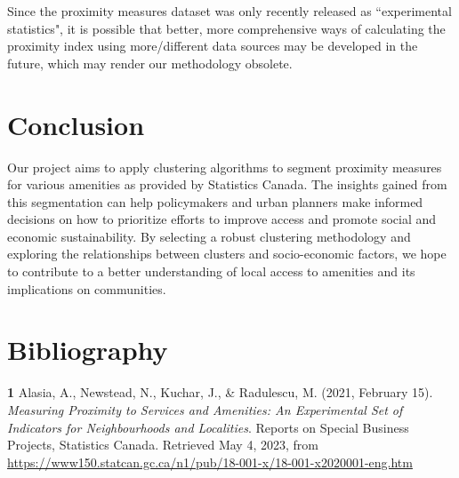 \documentclass[11pt, a4paper]{article}
\newcommand{\comment}[1]{}
\begin{document}
Since the proximity measures dataset was only recently released as ``experimental statistics", it is possible that better, more comprehensive ways of calculating the proximity index using more/different data sources may be developed in the future, which may render our methodology obsolete. 

\comment{
\begin{enumerate}
\item Since the proximity measures dataset was only recently released as ``experimental statistics", it is possible that better, more comprehensive ways of calculating the proximity index using more/different data sources may be developed in the future, which may render our methodology obsolete.
\end{enumerate}
}





\section*{Conclusion}


Our project aims to apply clustering algorithms to segment proximity measures for various amenities as provided by Statistics Canada. The insights gained from this segmentation can help policymakers and urban planners make informed decisions on how to prioritize efforts to improve access and promote social and economic sustainability. By selecting a robust clustering methodology and exploring the relationships between clusters and socio-economic factors, we hope to contribute to a better understanding of local access to amenities and its implications on communities.






\section*{Bibliography}


\noindent\textbf{1} Alasia, A., Newstead, N., Kuchar, J., \& Radulescu, M. (2021, February 15). \textit{Measuring Proximity to Services and Amenities: An Experimental Set of Indicators for Neighbourhoods and Localities}. Reports on Special Business Projects, Statistics Canada. Retrieved May 4, 2023, from \sloppy\url{https://www150.statcan.gc.ca/n1/pub/18-001-x/18-001-x2020001-eng.htm}  \\
\end{document}
